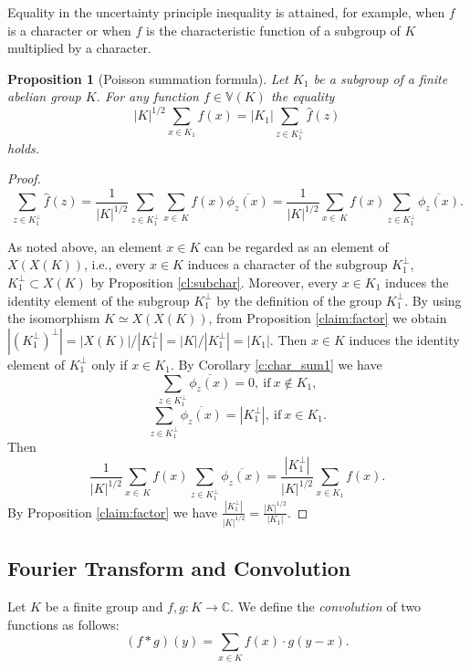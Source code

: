 \documentclass[11pt]{article}
\newtheorem{claim}{Proposition}[section]
\theoremstyle{definition}
\begin{document}
{{{Equality in the uncertainty principle inequality is attained, for example, when $f$ is a character or when $f$ is the characteristic function of a subgroup of $K$ multiplied by a character.










\begin{claim}[Poisson summation formula]\label{fsP}
Let $K_1$ be a subgroup of a finite abelian group $K$. For any function $f\in \mathbb{V}(K)$ the equality
$$|K|^{1/2}\sum\limits_{x\in K_1} f(x)= |K_1|\sum\limits_{z\in
K_1^\bot}\widehat{f}(z)$$
holds.
\end{claim}
\begin{proof}

$$\sum\limits_{z\in K_1^\bot}\widehat{f}(z)=\frac{1}{|K|^{1/2}}
\sum\limits_{z\in K_1^\bot}\sum\limits_{x\in\,K}f(x)
    \overline{\phi_z(x)}=\frac{1}{|K|^{1/2}}\sum\limits_{x\in\,K}f(x)\sum\limits_{z\in K_1^\bot}\overline{\phi_z(x)}.$$

As noted above, an element $x\in K$ can be regarded as an element of $X(X(K))$, i.e.,  every $x\in K$ induces a character of the subgroup $K_1^\bot$, $K_1^\bot\subset X(K)$ by Proposition \ref{cl:subchar}. Moreover, every $x\in K_1$ induces the identity element of the subgroup $K_1^\bot$ by the definition of the group $K_1^\bot$. By using the isomorphism $K\simeq X(X(K))$, from Proposition \ref{claim:factor} we obtain
$|(K_1^\bot)^\bot|=|X(K)|/|K_1^\bot|=|K|/|K_1^\bot|=|K_1|$. Then $x\in K$ induces the identity element   of  $K_1^\bot$ only if $x\in K_1$. By Corollary \ref{c:char_sum1} we have
$$\sum\limits_{z\in
    K_1^\bot}\overline{\phi_z(x)}=0,\ \text{if}\ x\not \in K_1,$$
    $$\sum\limits_{z\in
    K_1^\bot}\overline{\phi_z(x)}=|K_1^\bot|,\ \text{if}\ x \in K_1.$$
     Then
$$\frac{1}{|K|^{1/2}}\sum\limits_{x\in\,K}f(x)\sum\limits_{z\in
    K_1^\bot}\overline{\phi_z(x)}= \frac{|K_1^\bot|}{|K|^{1/2}}\sum\limits_{x\in K_1}
    f(x).$$
By Proposition \ref{claim:factor} we have
$\frac{|K_1^\bot|}{|K|^{1/2}}=\frac{|K|^{1/2}}{|K_1|}$.
\end{proof}


\subsection{Fourier Transform and Convolution}

Let $K$ be a finite group and $f,g: K\rightarrow \mathbb{C}$. We define the {\sl convolution} of two functions as follows:
\[
(f*g)(y)=\sum\limits_{x\in K} f(x)\cdot g(y-x).
\]

}}}
\end{document}
